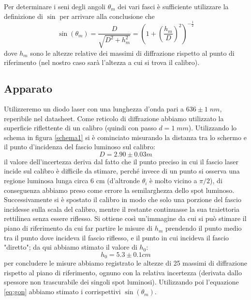 \documentclass[10pt, a4paper, italian]{article}
\begin{document}
Per determinare i seni degli angoli $\theta _m$ dei vari fasci è sufficiente utilizzare la definizione di $\sin$ per arrivare alla conclusione che
\begin{equation}
\sin(\theta _m)=\frac{D}{\sqrt{D^2 + h_m^2}}=(1+ (\frac{h_m}{D})^2)^{-\frac{1}{2}}
\label{eq:gon}
\end{equation}
dove $h_m$ sono le altezze relative dei massimi di diffrazione rispetto al punto di riferimento (nel nostro caso sarà l'altezza a cui si trova il calibro).
\subsection{Apparato}
Utilizzeremo un diodo laser con una lunghezza d'onda pari a $636 \pm 1 \; nm$, reperibile nel datasheet.
Come reticolo di diffrazione abbiamo utilizzato la superficie riflettente di un calibro (quindi con passo $d=1 \; mm$).
Utilizzando lo schema in figura \ref{schema1} si è cominciato misurando la distanza tra lo schermo e il punto d'incidenza del fascio luminoso sul calibro:
\[
D=2.90 \pm 0.03 m
\]
il valore dell'incertezza deriva dal fatto che il punto preciso in cui il fascio laser incide sul calibro è difficile da stimare, perché invece di un punto si osserva una regione luminosa lunga circa 6 cm (d'altronde $\theta _i$ è molto vicino a $\pi /2$), di conseguenza abbiamo preso come errore la semilarghezza dello spot luminoso.
Successivamente si è spostato il calibro in modo che solo una porzione del fascio incidesse sulla scala del calibro, mentre il restante continuasse la sua traiettoria rettilinea senza essere riflesso.
Si ottiene così un'immagine da cui si può stimare il piano di riferimento da cui far partire le misure di $h_m$ prendendo il punto medio tra il punto dove incideva il fascio riflesso, e il punto in cui incideva il fascio "diretto"; da qui abbiamo stimato il valore di $h_0$:
\[
h_0=5.3 \pm 0.1 cm
\]
per concludere le misure abbiamo registrato le altezze di 25 massimi di diffrazione rispetto al piano di riferimento, ognuno con la relativa incertezza (derivata dallo spessore non trascurabile dei singoli spot luminosi).
Utilizzando poi l'equazione \ref{eq:gon} abbiamo stimato i corrispettivi $\sin(\theta _m)$.
\end{document}
